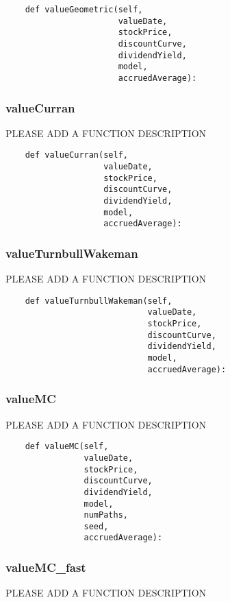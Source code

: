 \documentclass[twoside,11pt]{book}
\begin{document}
\begin{lstlisting}
    def valueGeometric(self,
                       valueDate,
                       stockPrice,
                       discountCurve,
                       dividendYield,
                       model,
                       accruedAverage):
\end{lstlisting}

\subsubsection*{{\bf valueCurran}}
PLEASE ADD A FUNCTION DESCRIPTION

\begin{lstlisting}
    def valueCurran(self,
                    valueDate,
                    stockPrice,
                    discountCurve,
                    dividendYield,
                    model,
                    accruedAverage):
\end{lstlisting}

\subsubsection*{{\bf valueTurnbullWakeman}}
PLEASE ADD A FUNCTION DESCRIPTION

\begin{lstlisting}
    def valueTurnbullWakeman(self,
                             valueDate,
                             stockPrice,
                             discountCurve,
                             dividendYield,
                             model,
                             accruedAverage):
\end{lstlisting}

\subsubsection*{{\bf valueMC}}
PLEASE ADD A FUNCTION DESCRIPTION

\begin{lstlisting}
    def valueMC(self,
                valueDate,
                stockPrice,
                discountCurve,
                dividendYield,
                model,
                numPaths,
                seed,
                accruedAverage):
\end{lstlisting}

\subsubsection*{{\bf valueMC\_fast}}
PLEASE ADD A FUNCTION DESCRIPTION
\end{document}
